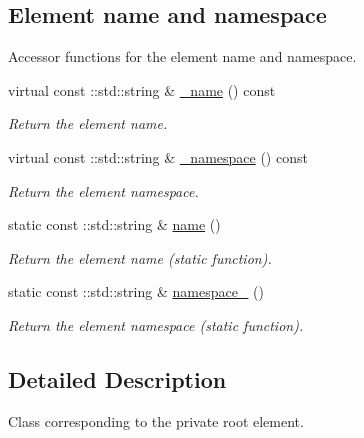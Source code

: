 \subsection*{Element name and namespace}
\label{_amgrpd4b5b61f6e07390f4af2465e04571f34}
Accessor functions for the element name and namespace. \begin{DoxyCompactItemize}
\item 
virtual const ::std::string \& \hyperlink{classopenstack_1_1xml_1_1Private_adbbb90f556830ef813d720653d65d3eb}{\_\-name} () const 
\begin{DoxyCompactList}\small\item\em Return the element name. \item\end{DoxyCompactList}\item 
virtual const ::std::string \& \hyperlink{classopenstack_1_1xml_1_1Private_a9d0cc7acb7b0581e7b2e43b4646c2981}{\_\-namespace} () const 
\begin{DoxyCompactList}\small\item\em Return the element namespace. \item\end{DoxyCompactList}\item 
static const ::std::string \& \hyperlink{classopenstack_1_1xml_1_1Private_a428d848b3e4c42f65d365234ee6fce30}{name} ()
\begin{DoxyCompactList}\small\item\em Return the element name (static function). \item\end{DoxyCompactList}\item 
static const ::std::string \& \hyperlink{classopenstack_1_1xml_1_1Private_a963dc4641452491ce5e45a73e60ec0a2}{namespace\_\-} ()
\begin{DoxyCompactList}\small\item\em Return the element namespace (static function). \item\end{DoxyCompactList}\end{DoxyCompactItemize}


\subsection{Detailed Description}
Class corresponding to the private root element. 

